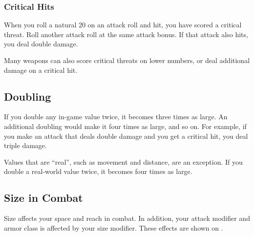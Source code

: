 \subsubsection{Critical Hits}\label{Critical Hits}
When you roll a natural 20 on an attack roll and hit, you have scored a critical threat. Roll another attack roll at the same attack bonus. If that attack also hits, you deal double damage.

Many weapons can also score critical threats on lower numbers, or deal additional damage on a critical hit.

\subsection{Doubling}\label{Doubling}
If you double any in-game value twice, it becomes three times as large. An additional doubling would make it four times as large, and so on. For example, if you make an attack that deals double damage and you get a critical hit, you deal triple damage.

 Values that are ``real'', such as movement and distance, are an exception. If you double a real-world value twice, it becomes four times as large. 

\subsection{Size in Combat}\label{Size in Combat}
Size affects your space and reach in combat. In addition, your attack modifier and armor class is affected by your size modifier. These effects are shown on . 

